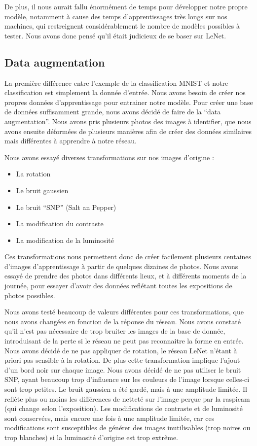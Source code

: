 \documentclass[a4paper,12pt]{article}
\begin{document}
  De plus, il nous aurait fallu énormément de temps pour développer notre propre modèle, notamment à cause des temps d'apprentissages très longs sur nos machines, qui restreignent considérablement le nombre de modèles possibles à tester. Nous avons donc pensé qu'il était judicieux de se baser sur LeNet.
  
  \subsection{Data augmentation}
    La première différence entre l'exemple de la classification MNIST et notre classification est simplement la donnée d'entrée. Nous avons besoin de créer nos propres données d'apprentissage pour entrainer notre modèle. Pour créer une base de données suffisamment grande, nous avons décidé de faire de la ``data augmentation''. Nous avons pris plusieurs photos des images à identifier, que nous avons ensuite déformées de plusieurs manières afin de créer des données similaires mais différentes à apprendre à notre réseau.

    Nous avons essayé diverses transformations sur nos images d'origine :
    \begin{itemize}
      \item La rotation
      \item Le bruit gaussien
      \item Le bruit ``SNP'' (Salt an Pepper)
      \item La modification du contraste
      \item La modification de la luminosité
    \end{itemize}

    Ces transformations nous permettent donc de créer facilement plusieurs centaines d'images d'apprentissage à partir de quelques dizaines de photos. Nous avons essayé de prendre des photos dans différents lieux, et à différents moments de la journée, pour essayer d'avoir des données reflétant toutes les expositions de photos possibles.

    Nous avons testé beaucoup de valeurs différentes pour ces transformations, que nous avons changées en fonction de la réponse du réseau. Nous avons constaté qu'il n'est pas nécessaire de trop bruiter les images de la base de donnée, introduisant de la perte si le réseau ne peut pas reconnaitre la forme en entrée. Nous avons décidé de ne pas appliquer de rotation, le réseau LeNet n'étant à priori pas sensible à la rotation. De plus cette transformation implique l'ajout d'un bord noir sur chaque image.
    Nous avons décidé de ne pas utiliser le bruit SNP, ayant beaucoup trop d'influence sur les couleurs de l'image lorsque celles-ci sont trop petites. Le bruit gaussien a été gardé, mais à une amplitude limitée. Il reflète plus ou moins les différences de netteté sur l'image perçue par la raspicam (qui change selon l'exposition).
    Les modifications de contraste et de luminosité sont conservées, mais encore une fois à une amplitude limitée, car ces modifications sont susceptibles de générer des images inutilisables (trop noires ou trop blanches) si la luminosité d'origine est trop extrême. 
\end{document}
